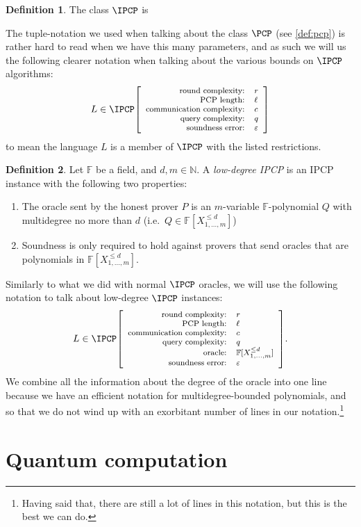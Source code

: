 \documentclass[english]{reedthesis}
\theoremstyle{plain}
\theoremstyle{definition}
\newtheorem{defn}[defn]{Definition}
\theoremstyle{remark}
\newcommand{\ipcp}[5]{%
  \ensuremath%
  \mleft[{\footnotesize\begin{array}{r l}
    \text{round complexity:} & #1 \\
    \text{PCP length:} & #2 \\
    \text{communication complexity:} & #3 \\
    \text{query complexity:} & #4 \\
    \text{soundness error:} & #5
  \end{array}}\mright]%
}
\newcommand{\ldipcp}[6]{%
  \ensuremath%
  \mleft[{\footnotesize\begin{array}{r l}
    \text{round complexity:} & #1 \\
    \text{PCP length:} & #2 \\
    \text{communication complexity:} & #3 \\
    \text{query complexity:} & #4 \\
    \text{oracle:} & #5 \\
    \text{soundness error:} & #6
  \end{array}}\mright]%
}
\begin{document}
\begin{defn}\label{def:ipcp-class}
  The class $\IPCP$ is %
\end{defn}

The tuple-notation we used when talking about the class $\PCP$ (see
\cref{def:pcp}) is rather hard to read when we have this many parameters, and as
such we will us the following clearer notation when talking about the various
bounds on $\IPCP$ algorithms:
\begin{equation*}
  L \in \IPCP\ipcp{r}{\ell}{c}{q}{\varepsilon}
\end{equation*}
to mean the language $L$ is a member of $\IPCP$ with the listed restrictions.


\begin{defn}\label{def:low-deg-ipcp}
  Let $\mathbb{F}$ be a field, and $d, m \in \mathbb{N}$. A \emph{low-degree IPCP} is an
  IPCP instance with the following two properties:
  \begin{enumerate}
    \item The oracle sent by the honest prover $P$ is an $m$-variable
          $\mathbb{F}$-polynomial $Q$ with multidegree no more than $d$ (i.e.\
          $Q \in \mathbb{F}[X_{1, \ldots, m}^{\le d}]$)
    \item Soundness is only required to hold against provers that send oracles
          that are polynomials in $\mathbb{F}[X_{1, \ldots, m}^{\le d}]$.
  \end{enumerate}
\end{defn}

Similarly to what we did with normal $\IPCP$ oracles, we will use the following
notation to talk about low-degree $\IPCP$ instances:
\begin{equation*}
  L \in \IPCP\ldipcp{r}{\ell}{c}{q}{\mathbb{F}[X_{1, \ldots, m}^{\le d}]}{\varepsilon}.
\end{equation*}
We combine all the information about the degree of the oracle into one line
because we have an efficient notation for multidegree-bounded polynomials, and
so that we do not wind up with an exorbitant number of lines in our
notation.\footnote{Having said that, there are still a lot of lines in this
  notation, but this is the best we can do.}


\chapter{Quantum computation}\label{chap:quantum}
\end{document}
